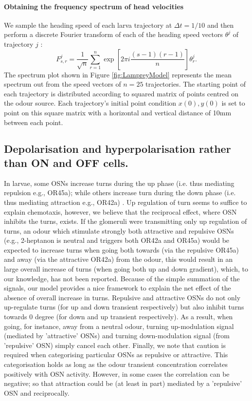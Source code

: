 \paragraph{Obtaining the frequency spectrum of head velocities}
We sample the heading speed of each larva trajectory at $\Delta t = 1/10$ and then perform a discrete Fourier transform of each of the heading speed vectors $\theta^j$ of trajectory $j$ :
\begin{equation}
F_{s,r}^j = \frac{1}{\sqrt{n}} \sum_{r=1}^n \exp{\left[2 \pi i \frac{ (s-1)(r-1)}{n}\right]} \theta_r^j.
\end{equation}
The spectrum plot shown in Figure \ref{fig:LampreyModel} represents the mean spectrum  out from the speed vectors of $n=25$ trajectories. The starting point of each trajectory is distributed according to squared matrix of points centred on the odour source. Each trajectory's initial point condition $x(0),y(0)$ is set to point on this square matrix with a horizontal and vertical distance of 10mm between each point.

\subsection{Depolarisation and hyperpolarisation rather than ON and OFF cells.}
In larvae, some OSNs increase turns during the up phase (i.e. thus mediating repulsion e.g., OR45a); while others increase turn during the down phase (i.e. thus mediating attraction e.g., OR42a) \citep{hernandez2015reverse}.
 Up regulation of turn seems to suffice to explain chemotaxis, however, we believe that the reciprocal effect, where OSN inhibits the turns, exists.
 If the glomeruli were transmitting only up regulation of turns, an odour which stimulate strongly both attractive and repulsive OSNs (e.g., 2-heptanon is neutral and triggers both OR42a and OR45a) would be expected to increase turns when going both towards (via the repulsive OR45a) and away (via the attractive OR42a) from the odour, this would result in an large overall increase of turns (when going both up and down gradient), which, to our knowledge, has not been reported. Because of the simple summation of the signals, our model provides a nice framework to explain the net effect of the absence of overall increase in turns.
 Repulsive and attractive OSNs do not only up-regulate turns (for up and down transient respectively) but also inhibit turns towards 0 degree (for down and up transient respectively). As a result, when going, for instance, away from a neutral odour, turning up-modulation signal (mediated by 'attractive' OSNs) and turning down-modulation signal (from 'repulsive' OSN) simply cancel each other.
  Finally, we note that caution is required when categorising particular OSNs as repulsive or attractive. This categorisation holds as long as the odour transient concentration correlates positively with OSN activity. However, in some cases the correlation can be negative; so that attraction could be (at least in part) mediated by a 'repulsive' OSN and reciprocally.

